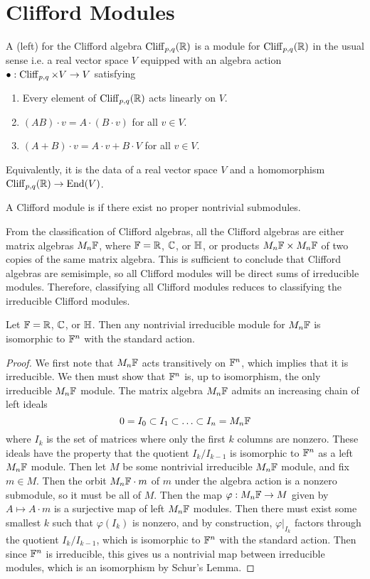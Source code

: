 %
\section{Clifford Modules}
%
\begin{defn}
A (left)  for the Clifford algebra $\operatorname{Cliff}_{p,q}(\mathbb{R})$ is a module
for $\operatorname{Cliff}_{p,q}(\mathbb{R})$ in the usual sense i.e. a real vector space $V$ equipped
with an algebra action $\bullet: \operatorname{Cliff}_{p,q} \times V \to V$ satisfying
\begin{enumerate}
  \item Every element of $\operatorname{Cliff}_{p,q}(\mathbb{R})$ acts linearly on $V$.
  \item $(AB) \cdot v = A\cdot(B \cdot v)$ for all $v \in V$.
  \item $(A + B) \cdot v = A\cdot v + B\cdot V$ for all $v \in V$.
\end{enumerate}
Equivalently, it is the data of a real vector space $V$ and a homomorphism
$\operatorname{Cliff}_{p,q}(\mathbb{R}) \to \operatorname{End}(V)$.
\end{defn}
%
\begin{defn}
A Clifford module is  if there exist no proper nontrivial submodules.
\end{defn}
%
From the classification of Clifford algebras, all the Clifford algebras are either
matrix algebras $M_n\mathbb{F}$, where $\mathbb{F} = \mathbb{R}$, $\mathbb{C}$, or $\mathbb{H}$, or products
$M_n\mathbb{F} \times M_n\mathbb{F}$ of two copies of the same matrix algebra. This is sufficient
to conclude that Clifford algebras are semisimple, so all Clifford modules
will be direct sums of irreducible modules. Therefore, classifying all Clifford
modules reduces to classifying the irreducible Clifford modules.
%
\begin{thm}
Let $\mathbb{F} = \mathbb{R}$, $\mathbb{C}$, or $\mathbb{H}$. Then any nontrivial irreducible module for
$M_n\mathbb{F}$ is isomorphic to $\mathbb{F}^n$ with the standard action.
\end{thm}
%
\begin{proof}
We first note that $M_n\mathbb{F}$ acts transitively on $\mathbb{F}^n$, which implies that
it is irreducible. We then must show that $\mathbb{F}^n$ is, up to isomorphism, the only
irreducible $M_n\mathbb{F}$ module. The matrix algebra $M_n\mathbb{F}$ admits an increasing
chain of left ideals
\[
0 = I_0 \subset I_1 \subset \ldots \subset I_n = M_n\mathbb{F}
\]
where $I_k$ is the set of matrices where only the first $k$ columns are nonzero.
These ideals have the property that the quotient $I_k / I_{k-1}$ is isomorphic
to $\mathbb{F}^n$ as a left $M_n\mathbb{F}$ module. Then let $M$ be some nontrivial irreducible
$M_n\mathbb{F}$ module, and fix $m \in M$. Then the orbit $M_n\mathbb{F} \cdot m$ of $m$
under the algebra action is a nonzero submodule, so it must be all of $M$.
Then the map $\varphi : M_n\mathbb{F} \to M$ given by $A \mapsto A \cdot m$ is
a surjective map of left $M_n\mathbb{F}$ modules. Then there must exist some smallest
$k$ such that $\varphi(I_k)$ is nonzero, and by construction,
$\varphi\vert_{I_k}$ factors through the quotient $I_k / I_{k-1}$, which
is isomorphic to $\mathbb{F}^n$ with the standard action. Then since $\mathbb{F}^n$ is irreducible,
this gives us a nontrivial map between irreducible modules, which is an isomorphism
by Schur's Lemma.
\end{proof}
